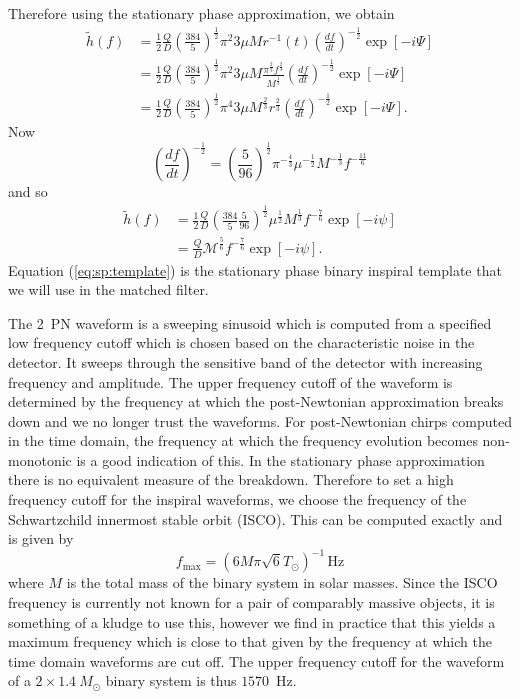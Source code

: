 Therefore using the stationary phase approximation, we obtain
\begin{align}
\tilde{h}(f) &= \frac{1}{2} \frac{Q}{D} \left(\frac{384}{5}\right)^\frac{1}{2} \pi^{2}{3} \mu M
                r^{-1}(t) \left(\frac{df}{dt}\right)^{-\frac{1}{2}} \exp\left[-i \Psi\right] \\
             &= \frac{1}{2} \frac{Q}{D} \left(\frac{384}{5}\right)^\frac{1}{2} \pi^{2}{3} \mu M
                \frac{\pi^\frac{2}{3} f^\frac{2}{3}}{M^\frac{1}{3}}
                \left(\frac{df}{dt}\right)^{-\frac{1}{2}} \exp\left[-i \Psi\right] \\
             &= \frac{1}{2} \frac{Q}{D} \left(\frac{384}{5}\right)^\frac{1}{2} \pi^{4}{3} \mu
                M^\frac{2}{3} r^\frac{2}{3}
                \left(\frac{df}{dt}\right)^{-\frac{1}{2}} \exp\left[-i \Psi\right].
\end{align}
Now
\begin{equation}
\left(\frac{df}{dt}\right)^{-\frac{1}{2}} =
\left(\frac{5}{96}\right)^\frac{1}{2} \pi^{-\frac{4}{3}} 
\mu^{-\frac{1}{2}} M^{-\frac{1}{3}} f^{-\frac{11}{6}}
\end{equation}
and so 
\begin{align}
\tilde{h}(f) &= \frac{1}{2} \frac{Q}{D} \left(\frac{384}{5} \frac{5}{96}\right)^\frac{1}{2}
                \mu^\frac{1}{2} M^\frac{1}{3} f^{-\frac{7}{6}} \exp\left[-i \psi\right] \\
             &= \frac{Q}{D} \mathcal{M}^\frac{5}{6} f^{-\frac{7}{6}} \exp\left[-i \psi\right].
             \label{eq:sp:template}
\end{align}
Equation (\ref{eq:sp:template}) is the stationary phase binary inspiral
template that we will use in the matched filter.


The 2~PN waveform is a sweeping sinusoid which is computed from a specified 
low frequency cutoff which is chosen based on the characteristic noise in the
detector. It sweeps through the sensitive band of the detector with increasing
frequency and amplitude.  The upper frequency cutoff of the waveform is
determined by the frequency at which the post-Newtonian approximation breaks
down and we no longer trust the waveforms. For post-Newtonian chirps computed
in the time domain, the frequency at which the frequency evolution becomes
non-monotonic is a good indication of this.  In the stationary phase
approximation there is no equivalent measure of the breakdown.  Therefore to
set a high frequency cutoff for the inspiral waveforms, we choose the
frequency of the Schwartzchild innermost stable orbit (ISCO). This can be
computed exactly and is given by
\begin{equation}
f_{\mathrm{max}} = \left( 6M\pi\sqrt{6}T_\odot \right)^{-1}\,\mathrm{Hz}
\label{eq:isco}
\end{equation} where $M$ is the total mass of the binary system in solar
masses. Since the ISCO frequency is currently not known for a pair of
comparably massive objects, it is something of a kludge to use this, however
we find in practice that this yields a maximum frequency which is close to that
given by the frequency at which the time domain waveforms are cut off.  The
upper frequency cutoff for the waveform of a $2\times 1.4 \> M_\odot$ binary
system is thus $1570$~Hz.


